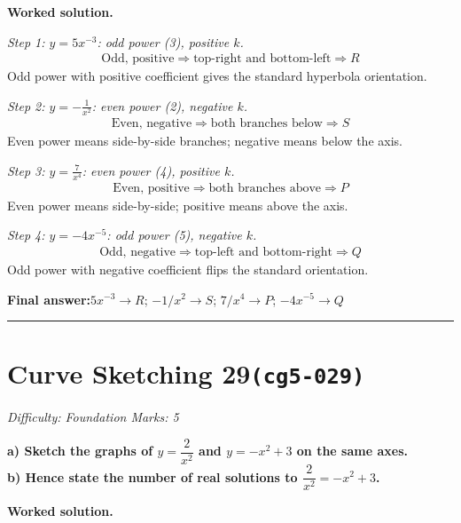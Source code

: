 \documentclass[11pt]{article}
\newcommand{\question}[1]{\par\medskip\noindent\textbf{#1}\par}
\begin{document}
\textbf{Worked solution.}

\textit{Step 1: \( y = 5x^{-3} \): odd power (3), positive \( k \).}
\[\begin{gathered}
\text{Odd, positive} \Rightarrow \text{top-right and bottom-left} \Rightarrow R
\end{gathered}\]
Odd power with positive coefficient gives the standard hyperbola orientation.

\textit{Step 2: \( y = -\frac{1}{x^2} \): even power (2), negative \( k \).}
\[\begin{gathered}
\text{Even, negative} \Rightarrow \text{both branches below} \Rightarrow S
\end{gathered}\]
Even power means side-by-side branches; negative means below the axis.

\textit{Step 3: \( y = \frac{7}{x^4} \): even power (4), positive \( k \).}
\[\begin{gathered}
\text{Even, positive} \Rightarrow \text{both branches above} \Rightarrow P
\end{gathered}\]
Even power means side-by-side; positive means above the axis.

\textit{Step 4: \( y = -4x^{-5} \): odd power (5), negative \( k \).}
\[\begin{gathered}
\text{Odd, negative} \Rightarrow \text{top-left and bottom-right} \Rightarrow Q
\end{gathered}\]
Odd power with negative coefficient flips the standard orientation.

\begin{answerbox}
\textbf{Final answer:}\quad \(\displaystyle 5x^{-3} \to R\); \(\displaystyle -1/x^2 \to S\); \(\displaystyle 7/x^4 \to P\); \(\displaystyle -4x^{-5} \to Q\)
\end{answerbox}
\medskip\hrule

\section*{Curve Sketching 29\quad\small\texttt{(cg5-029)}}
\textit{Difficulty: Foundation \quad\textbar\quad Marks: 5}

\question{a) Sketch the graphs of \( y = \dfrac{2}{x^2} \) and \( y = -x^2 + 3 \) on the same axes. \\[3pt] b) Hence state the number of real solutions to \( \dfrac{2}{x^2} = -x^2 + 3 \).}

\textbf{Worked solution.}
\end{document}
